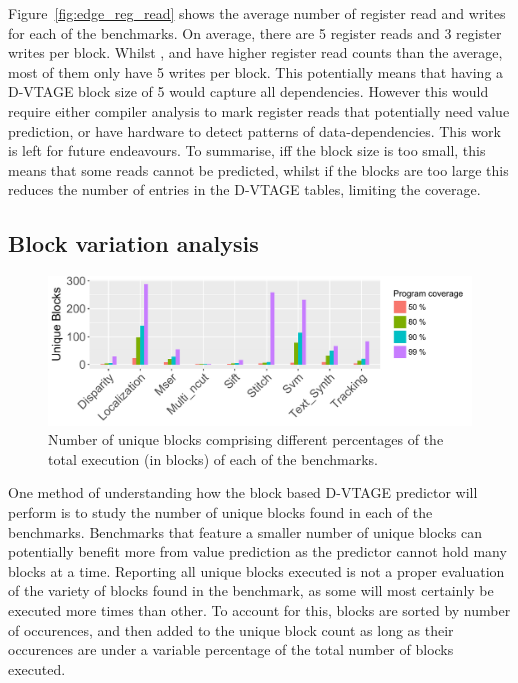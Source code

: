 Figure~\ref{fig:edge_reg_read} shows the average number of register read and writes for each of the benchmarks.
On average, there are 5 register reads and 3 register writes per block.
Whilst  ,  and  have higher register read counts than the average, most of them only have 5 writes per block.
This potentially means that having a D-VTAGE block size of 5 would capture all dependencies.
However this would require either compiler analysis to mark register reads that potentially need value prediction, or have hardware to detect patterns of data-dependencies.
This work is left for future endeavours.
To summarise, iff the block size is too small, this means that some reads cannot be predicted, whilst if the blocks are too large this reduces the number of entries in the D-VTAGE tables, limiting the coverage.

\subsection{Block variation analysis}

\begin{figure}[t]
    \centering
    \includegraphics[width=1\textwidth]{chapter3/graphics/unique_blocks.pdf}

    \caption{Number of unique blocks comprising different percentages of the total execution (in blocks) of each of the benchmarks.}
    \label{fig:totblock}
	\vspace{1em}
\end{figure}

One method of understanding how the block based D-VTAGE predictor will perform is to study the number of unique blocks found in each of the benchmarks.
Benchmarks that feature a smaller number of unique blocks can potentially benefit more from value prediction as the predictor cannot hold many blocks at a time.
Reporting all unique blocks executed is not a proper evaluation of the variety of blocks found in the benchmark, as some will most certainly be executed more times than other.
To account for this, blocks are sorted by number of occurences, and then added to the unique block count as long as their occurences are under a variable percentage of the total number of blocks executed.

